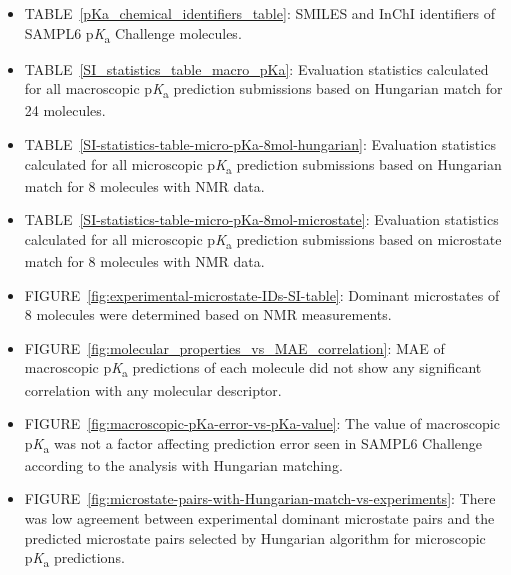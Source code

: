 \documentclass[9pt,lineno,final]{elife}
\newcommand{\pKa}{p\textit{K}\textsubscript{a}}
\begin{document}
\begin{itemize}
\item TABLE~\ref{pKa_chemical_identifiers_table}: SMILES and InChI identifiers of SAMPL6 \pKa{}  Challenge molecules.
\item TABLE~\ref{SI_statistics_table_macro_pKa}: Evaluation statistics calculated for all macroscopic \pKa{} prediction submissions based on Hungarian match for 24 molecules.
\item TABLE~\ref{SI-statistics-table-micro-pKa-8mol-hungarian}: Evaluation statistics calculated for all microscopic \pKa{} prediction submissions based on Hungarian match for 8 molecules with NMR data.
\item TABLE~\ref{SI-statistics-table-micro-pKa-8mol-microstate}: Evaluation statistics calculated for all microscopic \pKa{} prediction submissions based on microstate match for 8 molecules with NMR data.
\item FIGURE~\ref{fig:experimental-microstate-IDs-SI-table}: Dominant microstates of 8 molecules were determined based on NMR measurements.
\item FIGURE~\ref{fig:molecular_properties_vs_MAE_correlation}: MAE of macroscopic \pKa{} predictions of each molecule did not show any significant correlation with any molecular descriptor.
\item FIGURE~\ref{fig:macroscopic-pKa-error-vs-pKa-value}: The value of macroscopic \pKa{} was not a factor affecting prediction error seen in SAMPL6 Challenge according to the analysis with Hungarian matching.
\item FIGURE~\ref{fig:microstate-pairs-with-Hungarian-match-vs-experiments}: There was low agreement between experimental dominant microstate pairs and the predicted microstate pairs selected by Hungarian algorithm for microscopic \pKa{} predictions. 




\end{itemize}
\end{document}
